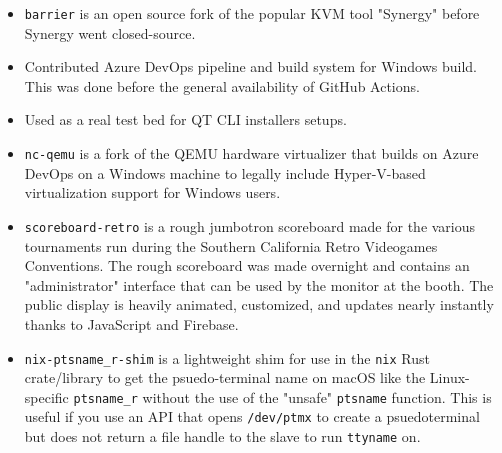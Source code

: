 \documentclass[10pt,letter,ragged2e]{altacv}
\begin{document}
\begin{paracol}{2}
\divider


\begin{itemize}
\item \texttt{barrier} is an open source fork of the popular KVM tool "Synergy" before Synergy went closed-source.
\item Contributed Azure DevOps pipeline and build system for Windows build. This was done before the general availability of GitHub Actions.
\item Used as a real test bed for QT CLI installers setups.
\end{itemize}

\divider


\begin{itemize}
\item \texttt{nc-qemu} is a fork of the QEMU hardware virtualizer that builds on Azure DevOps on a Windows machine to legally include Hyper-V-based virtualization support for Windows users. 
\end{itemize}


\divider


\begin{itemize}
\item \texttt{scoreboard-retro} is a rough jumbotron scoreboard made for the various tournaments run during the Southern California Retro Videogames Conventions. The rough scoreboard was made overnight and contains an "administrator" interface that can be used by the monitor at the booth. The public display is heavily animated, customized, and updates nearly instantly thanks to JavaScript and Firebase.
\end{itemize}

\divider


\begin{itemize}
\item \texttt{nix-ptsname\_r-shim} is a lightweight shim for use in the \texttt{nix} Rust crate/library to get the psuedo-terminal name on macOS like  the Linux-specific \texttt{ptsname\_r} without the use of the "unsafe" \texttt{ptsname} function. This is useful if you use an API that opens \texttt{/dev/ptmx} to create a psuedoterminal but does not return a file handle to the slave to run \texttt{ttyname} on.
\end{itemize}


\end{paracol}
\end{document}
